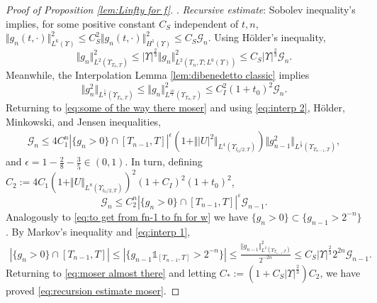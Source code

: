 \documentclass[11pt,a4paper,reqno]{amsart}
\theoremstyle{remark}
\theoremstyle{definition}
\numberwithin{equation}{section}
\begin{document}
\begin{proof}[Proof of Proposition \ref{lem:Linfty for f}]
    . \textit{Recursive estimate}: Sobolev inequality's implies, for some positive constant $C_S$ independent of $t,n$, $\Vert g_n(t,\cdot) \Vert_{L^6(\Upsilon)}^2 \leq C_S^2 \Vert g_n(t,\cdot) \Vert_{H^1(\Upsilon)}^2 \leq C_S \mathscr{G}_n$. Using H\"older's inequality, 
    \begin{equation}\label{eq:interp 1}
        \Vert g_n \Vert^2_{L^2(\Upsilon_{T_n,T})} \leq |\Upsilon|^{\frac{2}{3}}\Vert g_n \Vert^2_{L^2(T_n,T;L^6(\Upsilon))} \leq  C_S  |\Upsilon|^{\frac{2}{3}} \mathscr{G}_n. 
    \end{equation}
Meanwhile, the Interpolation Lemma \ref{lem:dibenedetto classic} implies 
\begin{equation}\label{eq:interp 2}
    \Vert g_n^2 \Vert_{L^{\frac{5}{3}}(\Upsilon_{T_n,T})} \leq \Vert g_n \Vert^2_{L^{\frac{10}{3}}(\Upsilon_{T_n,T})} \leq C_I^2(1+t_0)^2 \mathscr{G}_n. 
\end{equation}
Returning to \eqref{eq:some of the way there moser} and using \eqref{eq:interp 2}, H\"older, Minkowski, and Jensen inequalities, 
\begin{equation*}
    \begin{aligned}
        \mathscr{G}_n \leq 4 C_1^n |\{g_n>0\} \cap [T_{n-1},T]|^\epsilon (1+ \Vert |U|^2 \Vert_{L^{4}(\Upsilon_{t_0/2,T})})  \Vert g_{n-1}^2 \Vert_{L^{\frac{5}{3}}(\Upsilon_{T_{n-1},T})}, 
    \end{aligned}
\end{equation*}
and $\epsilon = 1-\frac{2}{8}-\frac{3}{5} \in (0,1)$. In turn, defining $C_2 := 4C_1 (1+ \Vert U \Vert_{L^8(\Upsilon_{t_0/2,T})})^2 (1+C_I)^2(1+t_0)^2$, 
\begin{equation}\label{eq:moser almost there}
    \mathscr{G}_n \leq C_2^n |\{g_n >0 \} \cap [T_{n-1},T]|^\varepsilon \mathscr{G}_{n-1}. 
\end{equation}
Analogously to \eqref{eq:to get from fn-1 to fn for w} we have $\{g_n \!>\! 0\} \!\subset\! \{ g_{n-1} \!>\! 2^{-n}\}$. By Markov's inequality and \eqref{eq:interp 1}, 
\begin{equation*}
   \begin{aligned}
       |\{g_n \!>\!0 \} \!\cap\! [T_{n-1},T]| \leq  |\{g_{n-1} \mathds{1}_{[T_{n-1},T]} \!>\! 2^{-n} \}| \leq \frac{\Vert g_{n-1}\Vert_{L^2(\Upsilon_{T_{n-1},T})}^2}{ 2^{-2n}} \leq C_S  |\Upsilon|^{\frac{2}{3}}  2^{2n}\mathscr{G}_{n-1}. 
   \end{aligned}
\end{equation*}
Returning to \eqref{eq:moser almost there} and letting $C_* := (1+C_S  |\Upsilon|^{\frac{2}{3}}) C_2$, we have proved \eqref{eq:recursion estimate moser}. 


\end{proof}
\end{document}
